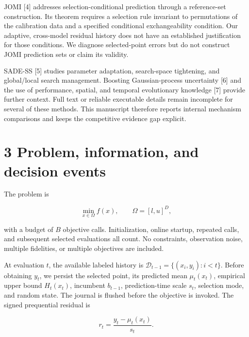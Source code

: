 \documentclass[11pt,a4paper]{article}
\begin{document}
JOMI {[}4{]} addresses selection-conditional prediction through a
reference-set construction. Its theorem requires a selection rule
invariant to permutations of the calibration data and a specified
conditional exchangeability condition. Our adaptive, cross-model
residual history does not have an established justification for those
conditions. We diagnose selected-point errors but do not construct JOMI
prediction sets or claim its validity.

SADE-SS {[}5{]} studies parameter adaptation, search-space tightening,
and global/local search management. Boosting Gaussian-process
uncertainty {[}6{]} and the use of performance, spatial, and temporal
evolutionary knowledge {[}7{]} provide further context. Full text or
reliable executable details remain incomplete for several of these
methods. This manuscript therefore reports internal mechanism
comparisons and keeps the competitive evidence gap explicit.

\par{}\noindent\begin{minipage}{\linewidth}

\hypertarget{problem-information-and-decision-events}{%
\section{3 Problem, information, and decision
events}\label{problem-information-and-decision-events}}

The problem is

\[\min_{x\in\Omega}f(x),\qquad\Omega=[l,u]^D,\]

\end{minipage}\par

with a budget of \(B\) objective calls. Initialization, online startup,
repeated calls, and subsequent selected evaluations all count. No
constraints, observation noise, multiple fidelities, or multiple
objectives are included.

\par\noindent\begin{minipage}{\linewidth}

At evaluation \(t\), the available labeled history is
\(\mathcal D_{t-1}=\{(x_i,y_i):i<t\}\). Before obtaining \(y_t\), we
persist the selected point, its predicted mean \(\mu_t(x_t)\), empirical
upper bound \(H_t(x_t)\), incumbent \(b_{t-1}\), prediction-time scale
\(s_t\), selection mode, and random state. The journal is flushed before
the objective is invoked. The signed prequential residual is

\[r_t=\frac{y_t-\mu_t(x_t)}{s_t}.\]

\end{minipage}\par
\end{document}
